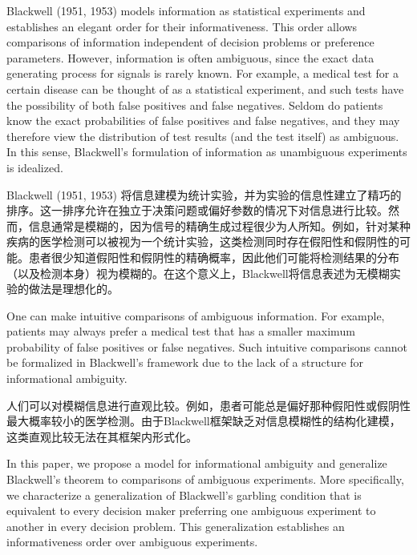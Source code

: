 \documentclass[12pt,a4paper]{article}
\newenvironment{original}
  {\par\vspace{4pt}\noindent\color{black}\ignorespaces}
  {\par\vspace{2pt}}
\newenvironment{translation}
  {\par\vspace{2pt}\noindent\color{myblue}\ignorespaces}
  {\par\vspace{6pt}}
\begin{document}
\begin{original}
Blackwell (1951, 1953) models information as statistical experiments and establishes an elegant order for their informativeness. This order allows comparisons of information independent of decision problems or preference parameters. However, information is often ambiguous, since the exact data generating process for signals is rarely known. For example, a medical test for a certain disease can be thought of as a statistical experiment, and such tests have the possibility of both false positives and false negatives. Seldom do patients know the exact probabilities of false positives and false negatives, and they may therefore view the distribution of test results (and the test itself) as ambiguous. In this sense, Blackwell's formulation of information as unambiguous experiments is idealized.
\end{original}

\begin{translation}
Blackwell (1951, 1953) 将信息建模为统计实验，并为实验的信息性建立了精巧的排序。这一排序允许在独立于决策问题或偏好参数的情况下对信息进行比较。然而，信息通常是模糊的，因为信号的精确生成过程很少为人所知。例如，针对某种疾病的医学检测可以被视为一个统计实验，这类检测同时存在假阳性和假阴性的可能。患者很少知道假阳性和假阴性的精确概率，因此他们可能将检测结果的分布（以及检测本身）视为模糊的。在这个意义上，Blackwell将信息表述为无模糊实验的做法是理想化的。
\end{translation}

\begin{original}
One can make intuitive comparisons of ambiguous information. For example, patients may always prefer a medical test that has a smaller maximum probability of false positives or false negatives. Such intuitive comparisons cannot be formalized in Blackwell's framework due to the lack of a structure for informational ambiguity.
\end{original}

\begin{translation}
人们可以对模糊信息进行直观比较。例如，患者可能总是偏好那种假阳性或假阴性最大概率较小的医学检测。由于Blackwell框架缺乏对信息模糊性的结构化建模，这类直观比较无法在其框架内形式化。
\end{translation}

\begin{original}
In this paper, we propose a model for informational ambiguity and generalize Blackwell's theorem to comparisons of ambiguous experiments. More specifically, we characterize a generalization of Blackwell's garbling condition that is equivalent to every decision maker preferring one ambiguous experiment to another in every decision problem. This generalization establishes an informativeness order over ambiguous experiments.
\end{original}
\end{document}
